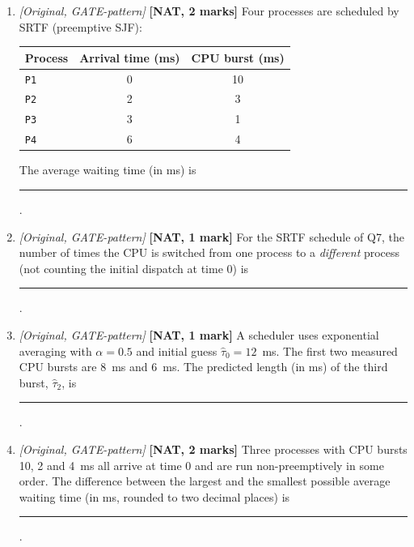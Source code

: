 \documentclass[11pt]{article}
\begin{document}
\begin{enumerate}
\item[\textbf{Q7}] \textit{[Original, GATE-pattern]} \textbf{[NAT, 2 marks]} Four processes are scheduled by SRTF (preemptive SJF):
\begin{center}\small\begin{tabular}{lcc}\toprule Process & Arrival time (ms) & CPU burst (ms) \\ \midrule \texttt{P1} & 0 & 10 \\ \texttt{P2} & 2 & 3 \\ \texttt{P3} & 3 & 1 \\ \texttt{P4} & 6 & 4 \\ \bottomrule\end{tabular}\end{center}
The average waiting time (in ms) is \rule{1.5cm}{0.4pt}.

\item[\textbf{Q8}] \textit{[Original, GATE-pattern]} \textbf{[NAT, 1 mark]} For the SRTF schedule of Q7, the number of times the CPU is switched from one process to a \emph{different} process (not counting the initial dispatch at time 0) is \rule{1.5cm}{0.4pt}.

\item[\textbf{Q9}] \textit{[Original, GATE-pattern]} \textbf{[NAT, 1 mark]} A scheduler uses exponential averaging with $\alpha = 0.5$ and initial guess $\hat{\tau}_0 = 12$~ms. The first two measured CPU bursts are 8~ms and 6~ms. The predicted length (in ms) of the third burst, $\hat{\tau}_2$, is \rule{1.5cm}{0.4pt}.

\item[\textbf{Q10}] \textit{[Original, GATE-pattern]} \textbf{[NAT, 2 marks]} Three processes with CPU bursts 10, 2 and 4~ms all arrive at time 0 and are run non-preemptively in some order. The difference between the largest and the smallest possible average waiting time (in ms, rounded to two decimal places) is \rule{1.5cm}{0.4pt}.
\end{enumerate}
\end{document}

